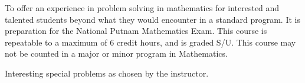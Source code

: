 \documentclass{osucourse}
\begin{document}
\CatalogDescription
\PrerequisitesAndExclusions

\begin{Purpose}
To offer an experience in problem solving in mathematics for interested and talented students beyond what they would encounter in a standard program. It is preparation for the National Putnam Mathematics Exam. This course is repeatable to a maximum of 6 credit hours, and is graded S/U. This course may not be counted in a major or minor program in Mathematics.
\end{Purpose}

\begin{TopicsOutline}
Interesting special problems as chosen by the instructor.
\end{TopicsOutline}
\end{document}
